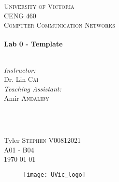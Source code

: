 \begin{titlepage}

\center
 
\textsc{\LARGE University of Victoria}\\[1cm] 	%
\textsc{\Large CENG 460}\\[0.5cm] 			%
\textsc{\large Computer Communication Networks}\\[0.5cm] 		%


\HRule \\[0.4cm]
{\huge \bfseries Lab 0 - Template}\\[0.2cm] %
\HRule \\[1.5cm]
 
 
\begin{minipage}{0.7\textwidth}
\begin{flushleft} 

\large\emph{Instructor:} \\
Dr. Lin \textsc{Cai} \\
\vspace{12 pt}
\emph{Teaching Assistant:} \\
Amir \textsc{Andaliby}

\end{flushleft}
\end{minipage}
~
\begin{minipage}{0.1\textwidth}
\begin{flushright} \large

\vspace{12 pt}

\end{flushright}
\end{minipage}\\[2cm]


\Large Tyler \textsc{Stephen}
\large V00812021	\\
A01 - B04\\[1.5cm] 


{\large \today}\\ %

\begin{figure}[b]	 %
	\centering
	\texttt{[image: UVic\_logo]}
\end{figure}

\end{titlepage}
